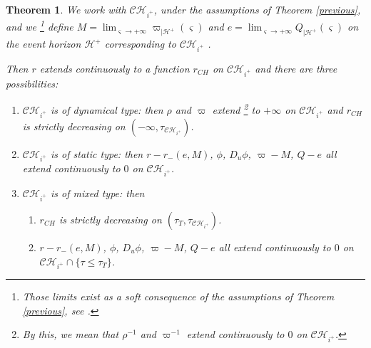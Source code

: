 \documentclass[10pt,a4paper]{article}
\theoremstyle{plain}
\newtheorem{thm}{Theorem}[section]
\theoremstyle{remark}
\theoremstyle{definition}
\theoremstyle{plain}
\theoremstyle{remark}
\theoremstyle{definition}
\newcommand{\CH}{\mathcal{CH}_{i^+}}
\numberwithin{equation}{section}
\begin{document}
\begin{thm} \label{classification}
	We work with $\CH$, under the assumptions of Theorem \ref{previous}, and we \footnote{Those limits exist as a soft consequence of the assumptions of Theorem \ref{previous}, see \cite{Moi}.} define $M= \lim_{\varsigma \rightarrow +\infty} \varpi_{|\mathcal{H}^+}(\varsigma)$ and $e= \lim_{\varsigma \rightarrow +\infty} Q_{|\mathcal{H}^+}(\varsigma)$ on the event horizon $\mathcal{H}^+$ corresponding to $\CH$ .
	
	
	Then $r$ extends continuously to a function $r_{CH}$ on $\CH$ and there are three possibilities: 
	\begin{enumerate}
		\item $\CH$ is of dynamical type: then $\rho$ and $\varpi$ extend \footnote{By this, we mean that $\rho^{-1}$ and $\varpi^{-1}$ extend continuously to $0$ on $\CH$.} to $+\infty$ on $\CH$ and $r_{CH}$ is strictly decreasing on $(-\infty,\tau_{\CH})$.
		
		\item $\CH$ is of static type: then $r-r_-(e,M)$, $\phi$, $D_u \phi$, $\varpi-M$, $Q-e$ all extend continuously to $0$ on $\CH$.
		
		
		
		\item $\CH$ is of mixed type: then \begin{enumerate}
			\item $r_{CH}$ is strictly decreasing on $(\tau_T,\tau_{\CH})$.
			\item $r-r_-(e,M)$, $\phi$, $D_u \phi$, $\varpi-M$, $Q-e$ all extend continuously to $0$ on $\CH \cap \{ \tau \leq \tau_T\} $.
			

\end{enumerate}
\end{enumerate}
\end{thm}
\end{document}
